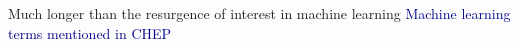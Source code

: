 \documentclass[aspectratio=169]{beamer}
\begin{document}
\begin{frame}{Much longer than the resurgence of interest in machine learning}
\vspace{0.25 cm}
\textcolor{darkblue}{\mbox{\hspace{-0.5 cm}}Machine learning terms mentioned in CHEP }

\vspace{-0.03 cm}
\begin{columns}
\end{columns}
\end{frame}
\end{document}
